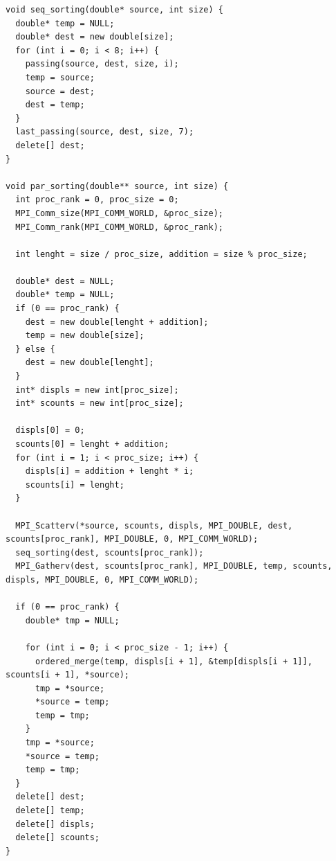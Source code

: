 \documentclass{report}
\begin{document}
\begin{lstlisting}
void seq_sorting(double* source, int size) {
  double* temp = NULL;
  double* dest = new double[size];
  for (int i = 0; i < 8; i++) {
    passing(source, dest, size, i);
    temp = source;
    source = dest;
    dest = temp;
  }
  last_passing(source, dest, size, 7);
  delete[] dest;
}

void par_sorting(double** source, int size) {
  int proc_rank = 0, proc_size = 0;
  MPI_Comm_size(MPI_COMM_WORLD, &proc_size);
  MPI_Comm_rank(MPI_COMM_WORLD, &proc_rank);

  int lenght = size / proc_size, addition = size % proc_size;

  double* dest = NULL;
  double* temp = NULL;
  if (0 == proc_rank) {
    dest = new double[lenght + addition];
    temp = new double[size];
  } else {
    dest = new double[lenght];
  }
  int* displs = new int[proc_size];
  int* scounts = new int[proc_size];

  displs[0] = 0;
  scounts[0] = lenght + addition;
  for (int i = 1; i < proc_size; i++) {
    displs[i] = addition + lenght * i;
    scounts[i] = lenght;
  }

  MPI_Scatterv(*source, scounts, displs, MPI_DOUBLE, dest, scounts[proc_rank], MPI_DOUBLE, 0, MPI_COMM_WORLD);
  seq_sorting(dest, scounts[proc_rank]);
  MPI_Gatherv(dest, scounts[proc_rank], MPI_DOUBLE, temp, scounts, displs, MPI_DOUBLE, 0, MPI_COMM_WORLD);

  if (0 == proc_rank) {
    double* tmp = NULL;

    for (int i = 0; i < proc_size - 1; i++) {
      ordered_merge(temp, displs[i + 1], &temp[displs[i + 1]], scounts[i + 1], *source);
      tmp = *source;
      *source = temp;
      temp = tmp;
    }
    tmp = *source;
    *source = temp;
    temp = tmp;
  }
  delete[] dest;
  delete[] temp;
  delete[] displs;
  delete[] scounts;
}


\end{lstlisting}
\newpage
\end{document}
